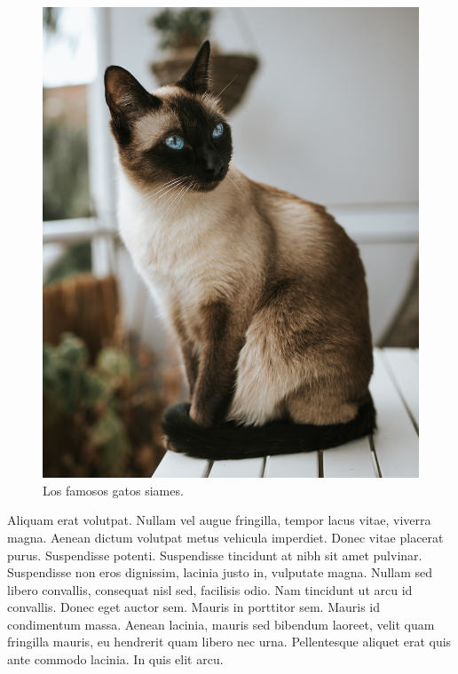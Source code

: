\documentclass[
  12pt,
  letterpaper,
  DIV=11,
  numbers=noendperiod,
  oneside]{scrreport}
\begin{document}
\begin{figure}
\begin{minipage}{0.50\linewidth}
{\includegraphics{imagenes/gato_siames.jpg}

}


\end{minipage}%

\caption{\label{fig-elephants}Los famosos gatos siames.}

\end{figure}%

Aliquam erat volutpat. Nullam vel augue fringilla, tempor lacus vitae,
viverra magna. Aenean dictum volutpat metus vehicula imperdiet. Donec
vitae placerat purus. Suspendisse potenti. Suspendisse tincidunt at nibh
sit amet pulvinar. Suspendisse non eros dignissim, lacinia justo in,
vulputate magna. Nullam sed libero convallis, consequat nisl sed,
facilisis odio. Nam tincidunt ut arcu id convallis. Donec eget auctor
sem. Mauris in porttitor sem. Mauris id condimentum massa. Aenean
lacinia, mauris sed bibendum laoreet, velit quam fringilla mauris, eu
hendrerit quam libero nec urna. Pellentesque aliquet erat quis ante
commodo lacinia. In quis elit arcu.
\end{document}

